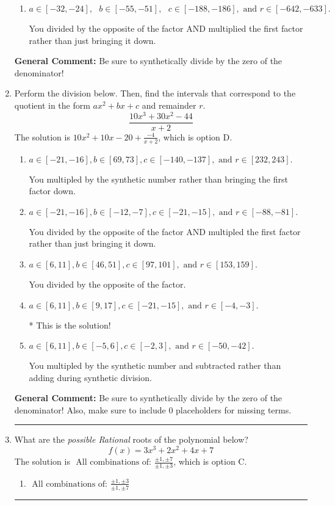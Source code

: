 \documentclass{extbook}[14pt]
\newcommand{\litem}[1]{\item #1

\rule{\textwidth}{0.4pt}}
\begin{document}
\begin{enumerate}
{\begin{enumerate}[label=\Alph*.]
 You multiplied by the synthetic number and subtracted rather than adding during synthetic division.
\item \( a \in [-32, -24], \text{   } b \in [-55, -51], \text{   } c \in [-188, -186], \text{   and   } r \in [-642, -633]. \)

 You divided by the opposite of the factor AND multiplied the first factor rather than just bringing it down.
\end{enumerate}

\textbf{General Comment:} Be sure to synthetically divide by the zero of the denominator!
}
\litem{
Perform the division below. Then, find the intervals that correspond to the quotient in the form $ax^2+bx+c$ and remainder $r$.
\[ \frac{10x^{3} +30 x^{2} -44}{x + 2} \]The solution is \( 10x^{2} +10 x -20 + \frac{-4}{x + 2} \), which is option D.\begin{enumerate}[label=\Alph*.]
\item \( a \in [-21, -16], b \in [69, 73], c \in [-140, -137], \text{ and } r \in [232, 243]. \)

 You multipled by the synthetic number rather than bringing the first factor down.
\item \( a \in [-21, -16], b \in [-12, -7], c \in [-21, -15], \text{ and } r \in [-88, -81]. \)

 You divided by the opposite of the factor AND multipled the first factor rather than just bringing it down.
\item \( a \in [6, 11], b \in [46, 51], c \in [97, 101], \text{ and } r \in [153, 159]. \)

 You divided by the opposite of the factor.
\item \( a \in [6, 11], b \in [9, 17], c \in [-21, -15], \text{ and } r \in [-4, -3]. \)

* This is the solution!
\item \( a \in [6, 11], b \in [-5, 6], c \in [-2, 3], \text{ and } r \in [-50, -42]. \)

 You multipled by the synthetic number and subtracted rather than adding during synthetic division.
\end{enumerate}

\textbf{General Comment:} Be sure to synthetically divide by the zero of the denominator! Also, make sure to include 0 placeholders for missing terms.
}
\litem{
What are the \textit{possible Rational} roots of the polynomial below?
\[ f(x) = 3x^{3} +2 x^{2} +4 x + 7 \]The solution is \( \text{ All combinations of: }\frac{\pm 1,\pm 7}{\pm 1,\pm 3} \), which is option C.\begin{enumerate}[label=\Alph*.]
\item \( \text{ All combinations of: }\frac{\pm 1,\pm 3}{\pm 1,\pm 7} \)


\end{enumerate}}
\end{enumerate}
\end{document}
